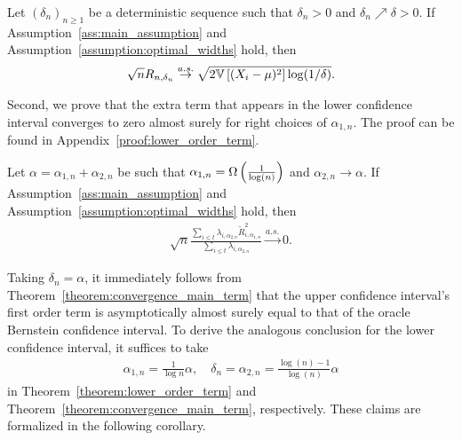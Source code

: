 \begin{theorem} \label{theorem:convergence_main_term}
     Let $(\delta_n)_{n\geq1}$ be a deterministic sequence such that $\delta_{n} > 0$ and $\delta_{n} \nearrow  \delta > 0$. If Assumption~\ref{ass:main_assumption} and Assumption~\ref{assumption:optimal_widths} hold, then 
    \begin{align*}
        \sqrt{n} R_{n, \delta_{n}} \stackrel{a.s.}{\to} \sqrt{2 \mathbb{V} \left[ (X_i-\mu)^2\right] \log (1/\delta)}.
    \end{align*}
\end{theorem}
Second, we prove that the extra term that appears in the lower confidence interval converges to zero almost surely for right choices of $\alpha_{1, n}$. The proof can be found in Appendix~\ref{proof:lower_order_term}.
\begin{theorem} \label{theorem:lower_order_term}
    Let $\alpha = \alpha_{1, n} + \alpha_{2, n}$ be such that $\alpha_{1, n} =  \Omega \left( \frac{1}{\log(n)} \right)$ and $\alpha_{2, n} \to \alpha$. If Assumption~\ref{ass:main_assumption} and Assumption~\ref{assumption:optimal_widths} hold, then
    \begin{align*}
    \sqrt{n}\frac{\sum_{i \leq t}\lambda_{i, \alpha_{2, n}} \tilde R_{i, \alpha_{1,n}}^2}{\sum_{i \leq t} \lambda_{i, \alpha_{2, n}}} \stackrel{a.s.}{\to} 0.
\end{align*}
\end{theorem}

Taking $\delta_n = \alpha$, it immediately follows from Theorem~\ref{theorem:convergence_main_term} that the upper confidence interval's first order term is asymptotically almost surely equal to that of the oracle Bernstein confidence interval. To derive the analogous conclusion for the lower confidence interval, it suffices to take
\begin{align} \label{eq:final_def_alphas}
    \alpha_{1, n} = \frac{1}{\log n}\alpha, \quad \delta_n = \alpha_{2, n} =  \frac{\log(n) - 1}{\log(n)} \alpha
\end{align}
in Theorem~\ref{theorem:lower_order_term} and Theorem~\ref{theorem:convergence_main_term}, respectively.  These claims are formalized in the following corollary.


